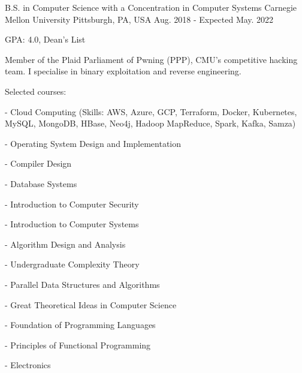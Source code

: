 

\begin{cventries}

  \cventry
    {B.S. in Computer Science with a Concentration in Computer Systems} %
    {Carnegie Mellon University} %
    {Pittsburgh, PA, USA} %
    {Aug. 2018 - Expected May. 2022} %
    {
      \begin{cvitems} %
      \item {GPA: 4.0, Dean's List}
      \item {Member of the Plaid Parliament of Pwning (PPP), CMU's competitive hacking team. I specialise in binary exploitation and reverse engineering.}
      \item {Selected courses:}
      \item[-] {Cloud Computing (Skills: AWS, Azure, GCP, Terraform, Docker, Kubernetes, MySQL, MongoDB, HBase, Neo4j, Hadoop MapReduce, Spark, Kafka, Samza)}
        \setlength\multicolsep{0pt}
        \begin{multicols}{2}
          \item[-] {Operating System Design and Implementation}
          \item[-] {Compiler Design}
	  \item[-] {Database Systems}
          \item[-] {Introduction to Computer Security}
          \item[-] {Introduction to Computer Systems}
          \item[-] {Algorithm Design and Analysis}
	  \item[-] {Undergraduate Complexity Theory}
          \item[-] {Parallel Data Structures and Algorithms}
          \item[-] {Great Theoretical Ideas in Computer Science}
	  \item[-] {Foundation of Programming Languages}
          \item[-] {Principles of Functional Programming}
          \item[-] {Electronics}

\end{multicols}
\end{cvitems}}
\end{cventries}
